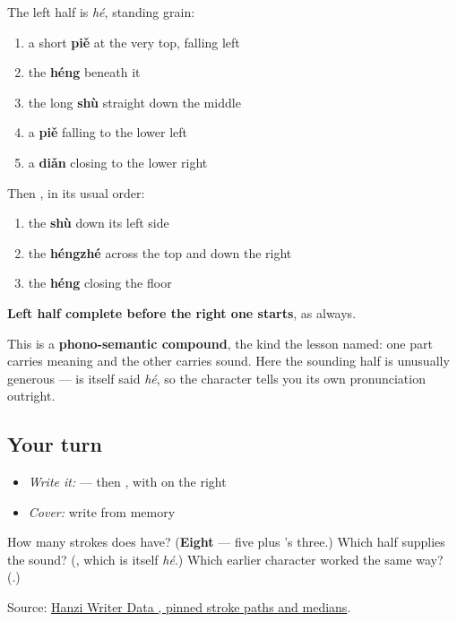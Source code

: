 The left half is  \emph{hé}, standing grain:

\begin{enumerate}
\raggedright
  \item a short \textbf{piě} at the very top, falling left
  \item the \textbf{héng} beneath it
  \item the long \textbf{shù} straight down the middle
  \item a \textbf{piě} falling to the lower left
  \item a \textbf{diǎn} closing to the lower right
\end{enumerate}

Then , in its usual order:

\begin{enumerate}
\raggedright
  \item the \textbf{shù} down its left side
  \item the \textbf{héngzhé} across the top and down the right
  \item the \textbf{héng} closing the floor
\end{enumerate}

\textbf{Left half complete before the right one starts}, as always.

This is a \textbf{phono-semantic compound}, the kind the  lesson named: one part carries meaning and the other carries sound. Here the sounding half is unusually generous —  is itself said \emph{hé}, so the character tells you its own pronunciation outright.

\subsection*{Your turn}
\begin{itemize}
\raggedright
  \item \emph{Write it:}  — then , with  on the right
  \item \emph{Cover:} write  from memory
\end{itemize}

\begin{tcolorbox}[breakable,colback=teal!4,colframe=teal!35!black,title={Before you move on}]
How many strokes does  have? (\textbf{Eight} — five plus 's three.) Which half supplies the sound? (\textbf{}, which is itself \emph{hé}.) Which earlier character worked the same way? (\textbf{}.)

Source: \href{https://raw.githubusercontent.com/chanind/hanzi-writer-data/68d10a4b21150cae5e1ebbd223eed289cf32d90c/data/\%E5\%92\%8C.json}{Hanzi Writer Data , pinned stroke paths and medians}.
\end{tcolorbox}
